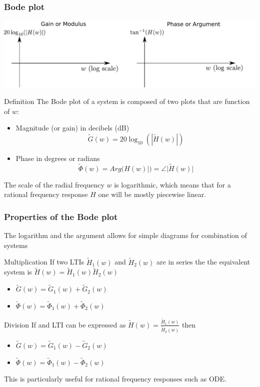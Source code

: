     \frametitle{Bode plot}

    \begin{center}
      \includegraphics[width=\linewidth]{imgs/fourier/diagramme_bode}
    \end{center}
    
    \begin{block}{Definition}
      The Bode plot of a system is composed of two plots that are function of $w$:
      \begin{itemize}
        \item Magnitude (or gain) in decibels (dB)
        $$\tilde G(w)=20\log_{10}{(|\tilde H(w)|)}$$
        \item Phase in degrees or radians
        $$\tilde \Phi(w)=Arg(H(w)|)=\angle |\tilde H(w)|$$
      \end{itemize}
      The scale of the radial frequency $w$ is logarithmic, which means that for a rational frequency response $H$ one will be mostly piecewise linear.
    \end{block}
    
    \frametitle{Properties of the Bode plot}
    The logarithm and the argument allows for simple diagrams for combination of systems 
    \begin{block}{Multiplication}
      If two LTIs $\tilde H_1(w)$ and $\tilde H_2(w)$ are in series the  the equivalent system is  $\tilde H(w)=\tilde H_1(w)\tilde H_2(w)$ %
      \begin{itemize}
      \item $\tilde G(w)=\tilde G_1(w)+\tilde G_2(w)$
      \item  $\tilde \Phi(w)=\tilde \Phi_1(w)+\tilde \Phi_2(w)$
      \end{itemize}
  
    \end{block}
    \begin{block}{Division}
      If and LTI can be expressed as
   $\displaystyle \tilde H(w)=\frac{\tilde H_1(w)}{\tilde H_2(w)}$
  then%
      \begin{itemize}
      \item $\tilde G(w)=\tilde G_1(w)-\tilde G_2(w)$
      \item  $\tilde \Phi(w)=\tilde \Phi_1(w)-\tilde \Phi_2(w)$
      \end{itemize}
      This is particularly useful for rational frequency responses such as ODE.
    \end{block}

